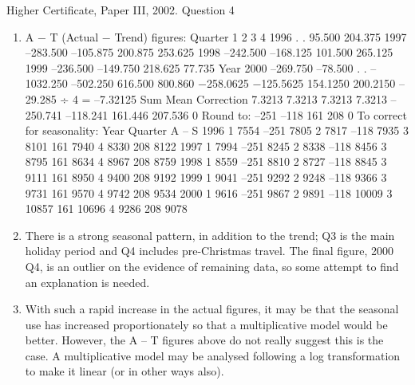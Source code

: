 \documentclass[a4paper,12pt]{article}
\begin{document}
Higher Certificate, Paper III, 2002. Question 4
\begin{enumerate} 
\item  A − T (Actual − Trend) figures:
Quarter
1 2 3 4
1996 . . 95.500 204.375
1997 –283.500 –105.875 200.875 253.625
1998 –242.500 –168.125 101.500 265.125
1999 –236.500 –149.750 218.625 77.735
Year
2000 –269.750 –78.500 . .
–1032.250 –502.250 616.500 800.860
−258.0625 −125.5625 154.1250 200.2150 –29.285 ÷ 4 =
–7.32125
Sum
Mean
Correction 7.3213 7.3213 7.3213 7.3213
–250.741 –118.241 161.446 207.536 0
Round to: –251 –118 161 208 0
To correct for seasonality:
Year Quarter A – S
1996 1 7554 –251 7805
2 7817 –118 7935
3 8101 161 7940
4 8330 208 8122
1997 1 7994 –251 8245
2 8338 –118 8456
3 8795 161 8634
4 8967 208 8759
1998 1 8559 –251 8810
2 8727 –118 8845
3 9111 161 8950
4 9400 208 9192
1999 1 9041 –251 9292
2 9248 –118 9366
3 9731 161 9570
4 9742 208 9534
2000 1 9616 –251 9867
2 9891 –118 10009
3 10857 161 10696
4 9286 208 9078
\item  There is a strong seasonal pattern, in addition to the trend; Q3 is the main
holiday period and Q4 includes pre-Christmas travel. The final figure, 2000 Q4, is an
outlier on the evidence of remaining data, so some attempt to find an explanation is
needed.
\item  With such a rapid increase in the actual figures, it may be that the seasonal use
has increased proportionately so that a multiplicative model would be better.
However, the A – T figures above do not really suggest this is the case. A
multiplicative model may be analysed following a log transformation to make it linear
(or in other ways also).

\end{enumerate}
\end{document}
